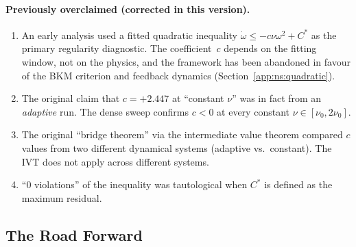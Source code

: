 \paragraph{Previously overclaimed (corrected in this version).}
\begin{enumerate}
\item An early analysis used a fitted quadratic inequality
  $\dot{\omega} \le -c\nu\omega^2 + C^*$ as the primary
  regularity diagnostic.  The coefficient~$c$ depends on
  the fitting window, not on the physics, and the
  framework has been abandoned in favour of the BKM
  criterion and feedback dynamics
  (Section~\ref{app:ns:quadratic}).

\item The original claim that $c = +2.447$ at ``constant $\nu$''
  was in fact from an \emph{adaptive} run.  The dense sweep
  confirms $c < 0$ at every constant $\nu \in [\nu_0, 2\nu_0]$.

\item The original ``bridge theorem'' via the intermediate
  value theorem compared $c$ values from two different
  dynamical systems (adaptive vs.\ constant).  The IVT does
  not apply across different systems.

\item ``0 violations'' of the inequality was tautological
  when $C^*$ is defined as the maximum residual.
\end{enumerate}

\subsection{The Road Forward}
\label{app:ns:road}

